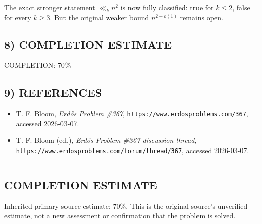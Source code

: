 The exact stronger statement $\ll_k n^2$ is now fully classified: true for $k\le 2$, false for every $k\ge 3$. But the original weaker bound $n^{2+o(1)}$ remains open.

\subsection*{8) COMPLETION ESTIMATE}
COMPLETION: 70\%

\subsection*{9) REFERENCES}
\begin{itemize}
\item[Bloom367] T. F. Bloom, \emph{Erd\H{o}s Problem \#367}, \texttt{https://www.erdosproblems.com/367}, accessed 2026-03-07.
\item[Thread367] T. F. Bloom (ed.), \emph{Erd\H{o}s Problem \#367 discussion thread}, \texttt{https://www.erdosproblems.com/forum/thread/367}, accessed 2026-03-07.
\end{itemize}

\bigskip\hrule\bigskip



\subsection*{COMPLETION ESTIMATE}
Inherited primary-source estimate: $70\%$. This is the original source's unverified estimate, not a new assessment or confirmation that the problem is solved.
